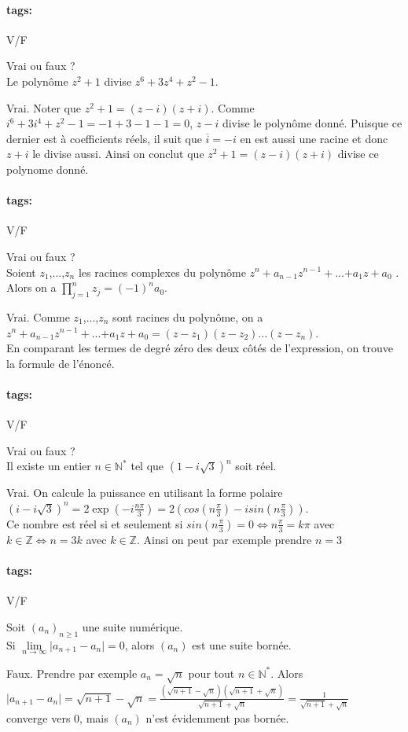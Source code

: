 \documentclass[12pt]{article}
\newcommand*{\xfield}[1]{\begin{mdframed}\centering #1\end{mdframed}\bigskip}
\newenvironment{note}{}{}
\newcommand*{\tags}[1]{\paragraph{tags: }#1}
\begin{document}
\begin{note}
\tags{V/F}
	\xfield{Vrai ou faux ?\\
	Le polynôme $z^2 + 1$ divise $z^6 + 3z^4 + z^2 - 1$.}
	\xfield{Vrai. Noter que $z^2 +1 = (z-i)(z+i)$. Comme$i^6 + 3i^4 + z^2 - 1=-1+3-1-1=0$, $z-i$ divise le polynôme donné. Puisque ce dernier est à coefficients réels, il suit que $\overline{i} = -i$ en est aussi une racine et donc $z+i$ le divise aussi. Ainsi on conclut que $z^2+1 = (z-i)(z+i)$ divise ce polynome donné.}
\end{note}

\begin{note}
\tags{V/F}
	\xfield{Vrai ou faux ?\\
	Soient $z_1$,...,$z_n$ les racines complexes du polynôme $z^n + a_{n-1}z^{n-1} +$...$+ a_1z + a_0$ .\\
	Alors on a $\prod\limits^n_{j=1} z_j = (-1)^n a_0$.}
	\xfield{Vrai. Comme $z_1$,...,$z_n$ sont racines du polynôme, on a\\
	$z^n + a_{n-1}z^{n-1} +$...$+ a_1z + a_0 = (z-z_1)(z-z_2)...(z-z_n)$.\\
	En comparant les termes de degré zéro des deux côtés de l'expression, on trouve la formule de l'énoncé.}
\end{note}

\begin{note}
	\tags{V/F}
	\xfield{Vrai ou faux ?\\
	Il existe un entier $n \in \mathbb{N}^*$ tel que $(1-i\sqrt{3})^n$ soit réel.}
	\xfield{Vrai. On calcule la puissance en utilisant la forme polaire\\
	$(i-i\sqrt{3})^n = 2 \exp{(-i\frac{n\pi}{3})} = 2\left(cos(n\frac{\pi}{3}) - i sin(n\frac{\pi}{3})\right)$.\\
	Ce nombre est réel si et seulement si $sin(n\frac{\pi}{3}) = 0 \Leftrightarrow n\frac{\pi}{3} = k \pi$ avec $k \in \mathbb{Z} \Leftrightarrow n = 3k$ avec $k \in \mathbb{Z}$. Ainsi on peut par exemple prendre $n=3$}
\end{note}

\begin{note}
\tags{V/F}
	\xfield{Soit $(a_n)_{n\ge 1}$ une suite numérique.\\
	Si $\lim\limits_{n \to \infty} \vert a_{n+1}-a_n \vert = 0$, alors $(a_n)$ est une suite bornée.}
	\xfield{Faux. Prendre par exemple $a_n = \sqrt{n}$ pour tout $n \in \mathbb{N}^*$. Alors\\
	$\vert a_{n+1} - a_n \vert = \sqrt{n+1} - \sqrt{n} = \frac{(\sqrt{n+1} - \sqrt{n})(\sqrt{n+1} + \sqrt{n})}{\sqrt{n+1} + \sqrt{n}} = \frac{1}{\sqrt{n+1} + \sqrt{n}}$\\
	converge vers 0, mais $(a_n)$ n'est évidemment pas bornée.}
\end{note}
\end{document}
